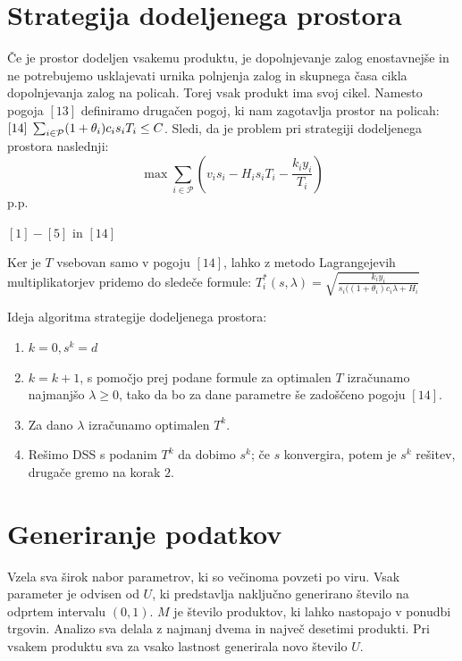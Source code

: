 \documentclass[a4paper]{article}
\begin{document}
\section{Strategija dodeljenega prostora}

Če je prostor dodeljen vsakemu produktu, je dopolnjevanje zalog enostavnejše in ne potrebujemo usklajevati urnika polnjenja zalog in skupnega časa cikla dopolnjevanja zalog na policah. Torej vsak produkt ima svoj cikel. Namesto pogoja $[13]$ definiramo drugačen pogoj, ki nam zagotavlja prostor na policah: $[14]\hspace*{1 mm} \sum_{i \in \mathcal{P}} (1 + \theta_i) c_i s_i T_i \leq C$. Sledi, da je problem pri strategiji dodeljenega prostora naslednji:
$$ \max  \sum_{i \in \mathcal{P}} ( v_i s_ i - H_i  s_i T_i - \frac{k_i y_i}{T_i})  $$
p.p.

$[1] - [5]$ in $[14]$

\vspace*{1 mm}
Ker je $T$ vsebovan samo v pogoju $[14]$, lahko z metodo Lagrangejevih multiplikatorjev pridemo do sledeče formule:
$T^*_i(s, \lambda) = \sqrt{\frac{k_i y_i}{s_i ((1+\theta_i)c_i\lambda + H_i}}$

Ideja algoritma strategije dodeljenega prostora:
\begin{enumerate}
\item $k = 0, s^k = d$
\item $k = k + 1$, s pomočjo prej podane formule  za optimalen $T$ izračunamo najmanjšo $\lambda \geq 0$, tako da bo za dane parametre še zadoščeno pogoju $[14]$.
\item Za dano $\lambda$ izračunamo optimalen $T^k$.
\item Rešimo DSS s podanim $T^k$ da dobimo $s^k$; če $s$ konvergira, potem je $s^k$ rešitev, drugače gremo na korak $2$.
\end{enumerate}

\section{Generiranje podatkov}


Vzela sva širok nabor parametrov, ki so večinoma povzeti po viru. Vsak parameter je odvisen od $U$, ki predstavlja naključno generirano število na odprtem intervalu $(0,1)$. $M$ je število produktov, ki lahko nastopajo v ponudbi trgovin. Analizo sva delala z najmanj dvema in največ desetimi produkti. Pri vsakem produktu sva za vsako lastnost generirala novo število $U$.

 \vspace*{3 mm}
\end{document}
